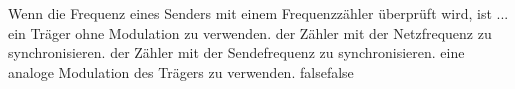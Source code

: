     {Wenn die Frequenz eines Senders mit einem Frequenzzähler überprüft wird, ist ...}
    {ein Träger ohne Modulation zu verwenden.}
    {der Zähler mit der Netzfrequenz zu synchronisieren.}
    {der Zähler mit der Sendefrequenz zu synchronisieren.}
    {eine analoge Modulation des Trägers zu verwenden.}
    {false}{false}
